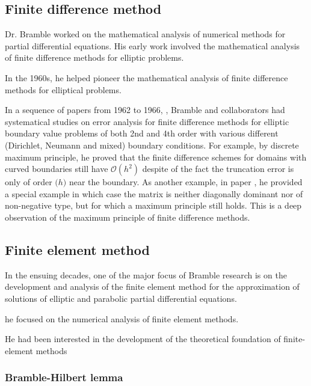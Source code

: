 \documentclass[CJK,11pt]{amsart}
\theoremstyle{definition}
\begin{document}
\begin{CJK*}{UTF8}{gbsn}
\subsection{Finite difference method}
Dr. Bramble worked on the mathematical analysis of numerical methods for partial differential equations. His early work involved the mathematical analysis of finite difference methods for elliptic problems. 

In the 1960s, he helped pioneer the mathematical analysis of finite difference methods for elliptical problems. 

In a sequence of papers from 1962 to 1966, \cite{bramble1962formulation, bramble1963fourth, bramble1964finite, bramble1965finite,bramble1965approximation,bramble1966second,bramble1966error}, Bramble and collaborators had systematical studies on error analysis for finite difference methods for elliptic boundary value problems of both 2nd and 4th order with various different (Dirichlet, Neumann and mixed) boundary conditions.  For example, by discrete maximum principle, he proved that the finite difference schemes for domains with curved boundaries still have $\mathcal O(h^2)$ despite of the fact the truncation error is only of order $\mathcal (h)$ near the boundary.  As another example, in paper \cite{bramble1964finite}, he provided a special example in which case the matrix is neither diagonally dominant nor of non-negative type, but for which a maximum principle still holds. This is a deep observation of the maximum principle of finite difference methods.

%

\subsection{Finite element method}
In the ensuing decades, one of the major focus of Bramble research is on the development and analysis of the finite element method for the approximation of solutions of elliptic and parabolic partial differential equations.


he focused on the numerical analysis of finite element methods.

He had been interested in the development of the theoretical foundation of finite-element methods 

\subsubsection{Bramble-Hilbert lemma}


\end{CJK*}
\end{document}
